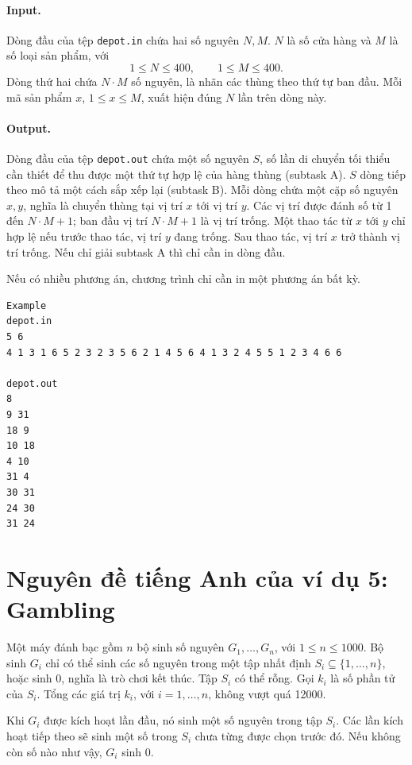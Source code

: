 \documentclass[11pt]{article}
\begin{document}
\paragraph{Input.}
Dòng đầu của tệp \texttt{depot.in} chứa hai số nguyên \(N,M\). \(N\) là số cửa
hàng và \(M\) là số loại sản phẩm, với
\[
  1\le N\le 400,\qquad 1\le M\le 400.
\]
Dòng thứ hai chứa \(N\cdot M\) số nguyên, là nhãn các thùng theo thứ tự ban đầu.
Mỗi mã sản phẩm \(x\), \(1\le x\le M\), xuất hiện đúng \(N\) lần trên dòng này.

\paragraph{Output.}
Dòng đầu của tệp \texttt{depot.out} chứa một số nguyên \(S\), số lần di chuyển
tối thiểu cần thiết để thu được một thứ tự hợp lệ của hàng thùng (subtask A).
\(S\) dòng tiếp theo mô tả một cách sắp xếp lại (subtask B). Mỗi dòng chứa một
cặp số nguyên \(x,y\), nghĩa là chuyển thùng tại vị trí \(x\) tới vị trí \(y\).
Các vị trí được đánh số từ 1 đến \(N\cdot M+1\); ban đầu vị trí \(N\cdot M+1\)
là vị trí trống. Một thao tác từ \(x\) tới \(y\) chỉ hợp lệ nếu trước thao tác,
vị trí \(y\) đang trống. Sau thao tác, vị trí \(x\) trở thành vị trí trống. Nếu
chỉ giải subtask A thì chỉ cần in dòng đầu.

Nếu có nhiều phương án, chương trình chỉ cần in một phương án bất kỳ.

\begin{verbatim}
Example
depot.in
5 6
4 1 3 1 6 5 2 3 2 3 5 6 2 1 4 5 6 4 1 3 2 4 5 5 1 2 3 4 6 6

depot.out
8
9 31
18 9
10 18
4 10
31 4
30 31
24 30
31 24
\end{verbatim}

\section{Nguyên đề tiếng Anh của ví dụ 5: Gambling}

Một máy đánh bạc gồm \(n\) bộ sinh số nguyên \(G_1,\ldots,G_n\), với
\(1\le n\le 1000\). Bộ sinh \(G_i\) chỉ có thể sinh các số nguyên trong một tập
nhất định \(S_i\subseteq\{1,\ldots,n\}\), hoặc sinh 0, nghĩa là trò chơi kết
thúc. Tập \(S_i\) có thể rỗng. Gọi \(k_i\) là số phần tử của \(S_i\). Tổng các
giá trị \(k_i\), với \(i=1,\ldots,n\), không vượt quá 12000.

Khi \(G_i\) được kích hoạt lần đầu, nó sinh một số nguyên trong tập \(S_i\). Các
lần kích hoạt tiếp theo sẽ sinh một số trong \(S_i\) chưa từng được chọn trước
đó. Nếu không còn số nào như vậy, \(G_i\) sinh 0.
\end{document}
